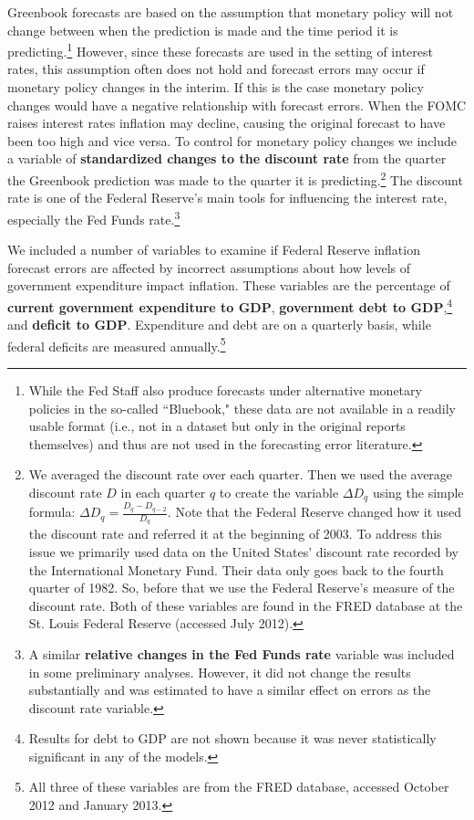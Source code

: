 \documentclass[a4paper]{article}
\begin{document}
Greenbook forecasts are based on the assumption that monetary policy will not change between when the prediction is made and the time period it is predicting.\footnote{While the Fed Staff also produce forecasts under alternative monetary policies in the so-called ``Bluebook," these data are not available in a readily usable format (i.e., not in a dataset but only in the original reports themselves) and thus are not used in the forecasting error literature.} However, since these forecasts are used in the setting of interest rates, this assumption often does not hold and forecast errors may occur if monetary policy changes in the interim. If this is the case monetary policy changes would have a negative relationship with forecast errors. When the FOMC raises interest rates inflation may decline, causing the original forecast to have been too high and vice versa. To control for monetary policy changes we include a variable of {\bf{standardized changes to the discount rate}} from the quarter the Greenbook prediction was made to the quarter it is predicting.\footnote{We averaged the discount rate over each quarter. Then we used the average discount rate $D$ in each quarter $q$ to create the variable $\Delta D_{q}$ using the simple formula: $\Delta D_{q} = \frac{D_{q} - D_{q-2}}{D_{q}}$. Note that the Federal Reserve changed how it used the discount rate and referred it at the beginning of 2003. To address this issue we primarily used data on the United States' discount rate recorded by the International Monetary Fund. Their data only goes back to the fourth quarter of 1982. So, before that we use the Federal Reserve's measure of the discount rate. Both of these variables are found in the FRED database at the St. Louis Federal Reserve (accessed July 2012). } The discount rate is one of the Federal Reserve's main tools for influencing the interest rate, especially the Fed Funds rate.\footnote{A similar {\bf{relative changes in the Fed Funds rate}} variable was included in some preliminary analyses. However, it did not change the results substantially and was estimated to have a similar effect on errors as the discount rate variable.}

We included a number of variables to examine if Federal Reserve inflation forecast errors are affected by incorrect assumptions about how levels of government expenditure impact inflation. These variables are the percentage of {\bf{current government expenditure to GDP}}, {\bf{government debt to GDP}},\footnote{Results for debt to GDP are not shown because it was never statistically significant in any of the models.} and \textbf{deficit to GDP}. Expenditure and debt are on a quarterly basis, while federal deficits are measured annually.\footnote{All three of these variables are from the FRED database, accessed October 2012 and January 2013.}
\end{document}
